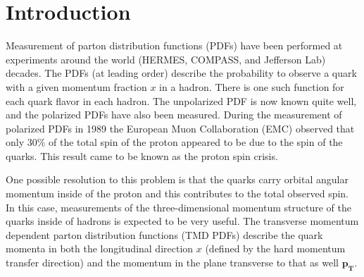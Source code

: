 \chapter{Introduction}

Measurement of parton distribution functions (PDFs) have been performed at experiments around the world (HERMES, COMPASS, and Jefferson Lab) decades.  The PDFs (at leading order) describe the probability to observe a quark with a given momentum fraction $x$ in a hadron.  There is one such function for each quark flavor in each hadron.  The unpolarized PDF is now known quite well, and the polarized PDFs have also been measured.  During the measurement of polarized PDFs in 1989 the European Muon Collaboration (EMC) observed that only 30\% of the total spin of the proton appeared to be due to the spin of the quarks.  This result came to be known as the proton spin crisis.  

One possible resolution to this problem is that the quarks carry orbital angular momentum inside of the proton and this contributes to the total observed spin.  In this case, measurements of the three-dimensional momentum structure of the quarks inside of hadrons is expected to be very useful.  The transverse momentum dependent parton distribution functions (TMD PDFs) describe the quark momenta in both the longitudinal direction $x$ (defined by the hard momentum transfer direction) and the momentum in the plane transverse to that as well $\mathbf{p_T}$.  



